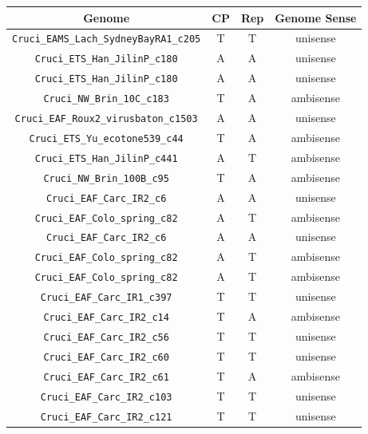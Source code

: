 \documentclass[eng]{ajceam-class}
\begin{document}
\begin{table}
\begin{center}
\scriptsize
\begin{tabular}{||c c c c||}
    \hline
    Genome & CP & Rep & Genome Sense \\ [0.5ex]
    \hline\hline
    \texttt{Cruci\_EAMS\_Lach\_SydneyBayRA1\_c205} & T & T & unisense \\
    \hline
    \texttt{Cruci\_ETS\_Han\_JilinP\_c180} & A & A & unisense \\
    \hline
    \texttt{Cruci\_ETS\_Han\_JilinP\_c180} & A & A & unisense \\
    \hline
    \texttt{Cruci\_NW\_Brin\_10C\_c183} & T & A & ambisense \\
    \hline
    \texttt{Cruci\_EAF\_Roux2\_virusbaton\_c1503} & A & A & unisense \\
    \hline
    \texttt{Cruci\_ETS\_Yu\_ecotone539\_c44} & T & A & ambisense \\
    \hline
    \texttt{Cruci\_ETS\_Han\_JilinP\_c441} & A & T & ambisense \\
    \hline
    \texttt{Cruci\_NW\_Brin\_100B\_c95} & T & A & ambisense \\
    \hline
    \texttt{Cruci\_EAF\_Carc\_IR2\_c6} & A & A & unisense \\
    \hline
    \texttt{Cruci\_EAF\_Colo\_spring\_c82} & A & T & ambisense \\
    \hline
    \texttt{Cruci\_EAF\_Carc\_IR2\_c6} & A & A & unisense \\
    \hline
    \texttt{Cruci\_EAF\_Colo\_spring\_c82} & A & T & ambisense \\
    \hline
    \texttt{Cruci\_EAF\_Colo\_spring\_c82} & A & T & ambisense \\
    \hline
    \texttt{Cruci\_EAF\_Carc\_IR1\_c397} & T & T & unisense \\
    \hline
    \texttt{Cruci\_EAF\_Carc\_IR2\_c14} & T & A & ambisense \\
    \hline
    \texttt{Cruci\_EAF\_Carc\_IR2\_c56} & T & T & unisense \\
    \hline
    \texttt{Cruci\_EAF\_Carc\_IR2\_c60} & T & T & unisense \\
    \hline
    \texttt{Cruci\_EAF\_Carc\_IR2\_c61} & T & A & ambisense \\
    \hline
    \texttt{Cruci\_EAF\_Carc\_IR2\_c103} & T & T & unisense \\
    \hline
    \texttt{Cruci\_EAF\_Carc\_IR2\_c121} & T & T & unisense \\

\end{tabular}
\end{center}
\end{table}
\end{document}
